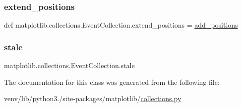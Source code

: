 \subsubsection{\texorpdfstring{extend\+\_\+positions}{extend\_positions}}
{\footnotesize\ttfamily def matplotlib.\+collections.\+Event\+Collection.\+extend\+\_\+positions = \hyperlink{classmatplotlib_1_1collections_1_1EventCollection_ac7cb967a80980594d16779819bdf6f3b}{add\+\_\+positions}\hspace{0.3cm}{\ttfamily [static]}}

\mbox{\label{classmatplotlib_1_1collections_1_1EventCollection_a9f2423f24b9163831883d9efa49d84bf}} 
\subsubsection{\texorpdfstring{stale}{stale}}
{\footnotesize\ttfamily matplotlib.\+collections.\+Event\+Collection.\+stale}



The documentation for this class was generated from the following file\+:\begin{DoxyCompactItemize}
\item 
venv/lib/python3./site-\/packages/matplotlib/\hyperlink{collections_8py}{collections.\+py}\end{DoxyCompactItemize}
